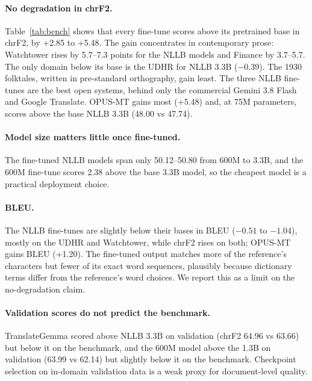 \documentclass[10pt,twocolumn]{article}
\begin{document}
\paragraph{No degradation in chrF2.} Table~\ref{tab:bench} shows that every fine-tune scores above its pretrained base in chrF2, by +2.85 to +5.48. The gain concentrates in contemporary prose: Watchtower rises by 5.7--7.3 points for the NLLB models and Finance by 3.7--5.7. The only domain below its base is the UDHR for NLLB 3.3B ($-0.39$). The 1930 folktales, written in pre-standard orthography, gain least. The three NLLB fine-tunes are the best open systems, behind only the commercial Gemini 3.8 Flash and Google Translate. OPUS-MT gains most (+5.48) and, at 75M parameters, scores above the base NLLB 3.3B (48.00 vs 47.74).

\paragraph{Model size matters little once fine-tuned.} The fine-tuned NLLB models span only 50.12--50.80 from 600M to 3.3B, and the 600M fine-tune scores 2.38 above the base 3.3B model, so the cheapest model is a practical deployment choice.

\paragraph{BLEU.} The NLLB fine-tunes are slightly below their bases in BLEU ($-0.51$ to $-1.04$), mostly on the UDHR and Watchtower, while chrF2 rises on both; OPUS-MT gains BLEU (+1.20). The fine-tuned output matches more of the reference's characters but fewer of its exact word sequences, plausibly because dictionary terms differ from the reference's word choices. We report this as a limit on the no-degradation claim.

\paragraph{Validation scores do not predict the benchmark.} TranslateGemma scored above NLLB 3.3B on validation (chrF2 64.96 vs 63.66) but below it on the benchmark, and the 600M model above the 1.3B on validation (63.99 vs 62.14) but slightly below it on the benchmark. Checkpoint selection on in-domain validation data is a weak proxy for document-level quality.
\end{document}
